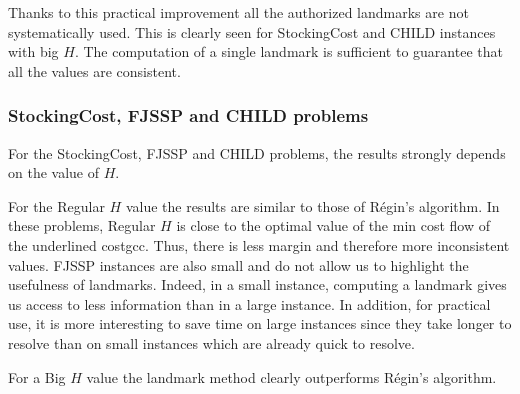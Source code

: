 Thanks to this practical improvement all the authorized landmarks are not systematically used. This is clearly seen for StockingCost and CHILD instances with big $H$. The computation of a single landmark is sufficient to guarantee that all the values are consistent.

\subsubsection{StockingCost, FJSSP and CHILD problems}

For the StockingCost, FJSSP and CHILD problems, the results strongly depends on the value of $H$.

For the Regular $H$ value the results are similar to those of Régin's algorithm. In these problems, Regular $H$ is close to the optimal value of the min cost flow of the underlined costgcc.
Thus, there is less margin and therefore more inconsistent values.
FJSSP instances are also small and do not allow us to highlight the usefulness of landmarks. Indeed, in a small instance, computing a landmark gives us access to less information than in a large instance. In addition, for practical use, it is more interesting to save time on large instances since they take longer to resolve than on small instances which are already quick to resolve.

For a Big $H$ value the landmark method clearly outperforms Régin's algorithm.

